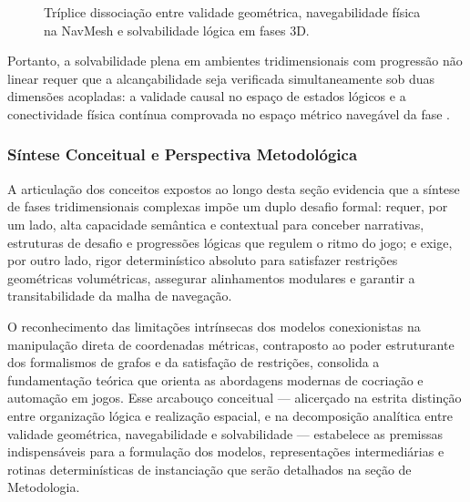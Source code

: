 \begin{figure}[htbp]
{%
  }
  \caption{Tríplice dissociação entre validade geométrica, navegabilidade física na NavMesh e solvabilidade lógica em fases 3D.}
  \label{fig:triplice_dissociacao}
\end{figure}

Portanto, a solvabilidade plena em ambientes tridimensionais com progressão não linear requer que a alcançabilidade seja verificada simultaneamente sob duas dimensões acopladas: a validade causal no espaço de estados lógicos e a conectividade física contínua comprovada no espaço métrico navegável da fase \cite{dormans2010, linden2014dungeons, xu2025constraint, xu2025databasedrivenframework3dlevel}.

\subsubsection{Síntese Conceitual e Perspectiva Metodológica}
\label{sec:sintese_transicao}

A articulação dos conceitos expostos ao longo desta seção evidencia que a síntese de fases tridimensionais complexas impõe um duplo desafio formal: requer, por um lado, alta capacidade semântica e contextual para conceber narrativas, estruturas de desafio e progressões lógicas que regulem o ritmo do jogo; e exige, por outro lado, rigor determinístico absoluto para satisfazer restrições geométricas volumétricas, assegurar alinhamentos modulares e garantir a transitabilidade da malha de navegação.

O reconhecimento das limitações intrínsecas dos modelos conexionistas na manipulação direta de coordenadas métricas, contraposto ao poder estruturante dos formalismos de grafos e da satisfação de restrições, consolida a fundamentação teórica que orienta as abordagens modernas de cocriação e automação em jogos. Esse arcabouço conceitual --- alicerçado na estrita distinção entre organização lógica e realização espacial, e na decomposição analítica entre validade geométrica, navegabilidade e solvabilidade --- estabelece as premissas indispensáveis para a formulação dos modelos, representações intermediárias e rotinas determinísticas de instanciação que serão detalhados na seção de Metodologia.
